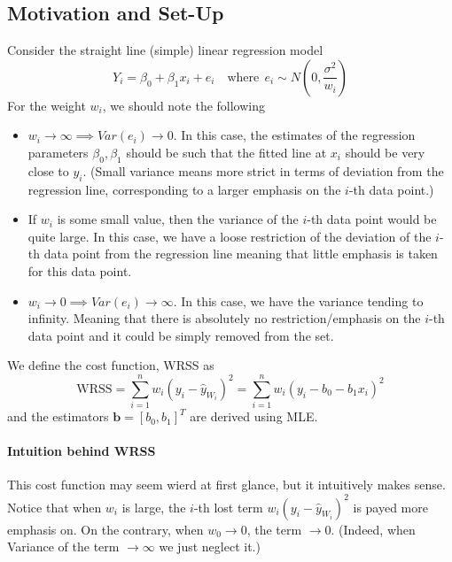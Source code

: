 \documentclass[10pt]{article}
\newcommand{\bb}{\mathbf{b}}
\begin{document}
\subsection{Motivation and Set-Up}
Consider the straight line (simple) linear regression model
\begin{equation*}
    Y_{i}=\beta_{0}+\beta_{1} x_{i}+e_{i} \quad \text{where}~~ e_i \sim N \left(0, \frac{\sigma^2}{w_i}\right)
\end{equation*}
For the weight $w_i$, we should note the following
\begin{itemize}
    \item $w_i \rightarrow \infty \implies Var(e_i) \rightarrow 0$. In this case, the estimates of the regression parameters $\beta_0, \beta_1$ should be such that the fitted line at $x_i$ should be very close to $y_i$. (Small variance means more strict in terms of deviation from the regression line, corresponding to a larger emphasis on the $i$-th data point.)
    \item If $w_i$ is some small value, then the variance of the $i$-th data point would be quite large. In this case, we have a loose restriction of the deviation of the $i$-th data point from the regression line meaning that little emphasis is taken for this data point.
    \item $w_i \rightarrow 0 \implies Var(e_i) \rightarrow \infty$. In this case, we have the variance tending to infinity. Meaning that there is absolutely no restriction/emphasis on the $i$-th data point and it could be simply removed from the set.
\end{itemize}
We define the cost function, WRSS as
\begin{equation*}
    \mathrm{WRSS}=\sum_{i=1}^{n} w_{i}\left(y_{i}-\hat{y}_{W_i}\right)^{2}=\sum_{i=1}^{n} w_{i}\left(y_{i}-b_{0}-b_{1} x_{i}\right)^{2}
\end{equation*}
and the estimators $\bb = [b_0, b_1]^T$ are derived using MLE. 

\paragraph{Intuition behind WRSS} This cost function may seem wierd at first glance, but it intuitively makes sense. Notice that when $w_i$ is large, the $i$-th lost term $w_{i}\left(y_{i}-\hat{y}_{W_i}\right)^{2}$ is payed more emphasis on. On the contrary, when $w_0 \rightarrow 0$, the term $\rightarrow 0$. (Indeed, when Variance of the term $\rightarrow \infty$ we just neglect it.)
\end{document}
